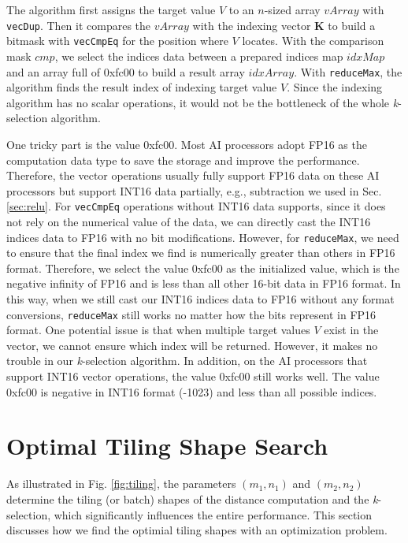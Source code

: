 \documentclass[12pt]{extbook}
\begin{document}
The algorithm first assigns the target value $V$ to an $n$-sized array $vArray$ with \verb|vecDup|. Then it compares the $vArray$ with the indexing vector \textbf{K} to build a bitmask with \verb|vecCmpEq| for the position where $V$ locates. With the comparison mask $cmp$, we select the indices data between a prepared indices map $idxMap$ and an array full of 0xfc00 to build a result array $idxArray$. With \verb|reduceMax|, the algorithm finds the result index of indexing target value $V$. Since the indexing algorithm has no scalar operations, it would not be the bottleneck of the whole \textit{k}-selection algorithm.

One tricky part is the value 0xfc00. Most AI processors \cite{DBLP:journals/micro/ChoquetteGGSK21, DBLP:conf/isca/LiuDTHLXCC16, DBLP:conf/isca/JouppiYPPABBBBB17, DBLP:conf/hotchips/LiaoTXZ19} adopt FP16 as the computation data type to save the storage and improve the performance. Therefore, the vector operations usually fully support FP16 data on these AI processors but support INT16 data partially, e.g., subtraction we used in Sec. \ref{sec:relu}. For \verb|vecCmpEq| operations without INT16 data supports, since it does not rely on the numerical value of the data, we can directly cast the INT16 indices data to FP16 with no bit modifications. However, for \verb|reduceMax|, we need to ensure that the final index we find is numerically greater than others in FP16 format. Therefore, we select the value 0xfc00 as the initialized value, which is the negative infinity of FP16 and is less than all other 16-bit data in FP16 format. In this way, when we still cast our INT16 indices data to FP16 without any format conversions, \verb|reduceMax| still works no matter how the bits represent in FP16 format. One potential issue is that when multiple target values $V$ exist in the vector, we cannot ensure which index will be returned. However, it makes no trouble in our \textit{k}-selection algorithm. In addition, on the AI processors that support INT16 vector operations, the value 0xfc00 still works well. The value 0xfc00 is negative in INT16 format (-1023) and less than all possible indices.

\section{Optimal Tiling Shape Search \label{sec:tile}}

As illustrated in Fig. \ref{fig:tiling}, the parameters $(m_1, n_1)$ and $(m_2, n_2)$ determine the tiling (or batch) shapes of the distance computation and the \textit{k}-selection, which significantly influences the entire performance. This section discusses how we find the optimial tiling shapes with an optimization problem.
\end{document}
